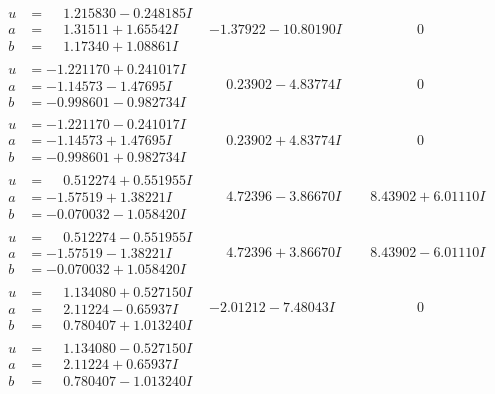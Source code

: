 \documentclass[1p]{elsarticle_modified}
\theoremstyle{definition}
\begin{document}
$$\begin{array}{c|c|c}
\begin{aligned}
u &= \phantom{-}1.215830 - 0.248185 I \\
a &= \phantom{-}1.31511 + 1.65542 I \\
b &= \phantom{-}1.17340 + 1.08861 I\end{aligned}
 & -1.37922 - 10.80190 I & \phantom{-0.000000 } 0 \\ \hline\begin{aligned}
u &= -1.221170 + 0.241017 I \\
a &= -1.14573 - 1.47695 I \\
b &= -0.998601 - 0.982734 I\end{aligned}
 & \phantom{-}0.23902 - 4.83774 I & \phantom{-0.000000 } 0 \\ \hline\begin{aligned}
u &= -1.221170 - 0.241017 I \\
a &= -1.14573 + 1.47695 I \\
b &= -0.998601 + 0.982734 I\end{aligned}
 & \phantom{-}0.23902 + 4.83774 I & \phantom{-0.000000 } 0 \\ \hline\begin{aligned}
u &= \phantom{-}0.512274 + 0.551955 I \\
a &= -1.57519 + 1.38221 I \\
b &= -0.070032 - 1.058420 I\end{aligned}
 & \phantom{-}4.72396 - 3.86670 I & \phantom{-}8.43902 + 6.01110 I \\ \hline\begin{aligned}
u &= \phantom{-}0.512274 - 0.551955 I \\
a &= -1.57519 - 1.38221 I \\
b &= -0.070032 + 1.058420 I\end{aligned}
 & \phantom{-}4.72396 + 3.86670 I & \phantom{-}8.43902 - 6.01110 I \\ \hline\begin{aligned}
u &= \phantom{-}1.134080 + 0.527150 I \\
a &= \phantom{-}2.11224 - 0.65937 I \\
b &= \phantom{-}0.780407 + 1.013240 I\end{aligned}
 & -2.01212 - 7.48043 I & \phantom{-0.000000 } 0 \\ \hline\begin{aligned}
u &= \phantom{-}1.134080 - 0.527150 I \\
a &= \phantom{-}2.11224 + 0.65937 I \\
b &= \phantom{-}0.780407 - 1.013240 I\end{aligned}

\end{array}$$
\end{document}
